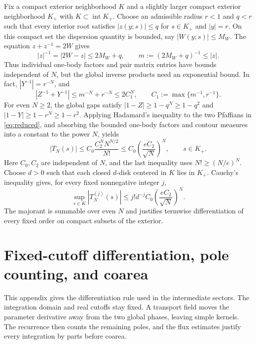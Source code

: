\documentclass[11pt]{article}
\numberwithin{equation}{section}
\theoremstyle{definition}
\begin{document}
Fix a compact exterior neighborhood \(K\) and a slightly larger
compact exterior neighborhood \(K_+\) with
\(K\subset\operatorname{int}K_+\). Choose an admissible radius
\(r<1\) and \(q<r\) such that every interior root satisfies
\(|z(y;s)|\le q\) for \(s\in K_+\) and \(|y|=r\).
On this compact set the dispersion quantity is bounded, say
\(|W(y;s)|\le M_W\). The equation \(z+z^{-1}=2W\) gives
\[
 |z|^{-1}=|2W-z|\le 2M_W+q,
 \qquad m:=(2M_W+q)^{-1}\le |z|.
\]
Thus individual one-body factors and pair matrix entries have bounds
independent of \(N\), but the global inverse products need an
exponential bound. In fact, \(|Y^{-1}|=r^{-N}\), and
\[
 |Z^{-1}+Y^{-1}|\le m^{-N}+r^{-N}\le 2C_1^N,
 \qquad C_1:=\max\{m^{-1},r^{-1}\}.
\]
For even \(N\ge2\), the global gaps satisfy
\(|1-Z|\ge1-q^N\ge1-q^2\) and
\(|1-Y|\ge1-r^N\ge1-r^2\).
Applying Hadamard's inequality to the two Pfaffians in
\eqref{eq:reduced}, and absorbing the bounded one-body factors and
contour measures into a constant to the power \(N\), yields
\[
 |T_N(s)|\le C_0\frac{C_2^N N^{N/2}}{N!}
       \le C_0\left(\frac{eC_2}{\sqrt N}\right)^N,
 \qquad s\in K_+.
\]
Here \(C_0,C_2\) are independent of \(N\), and the last inequality
uses \(N!\ge(N/e)^N\).
Choose \(d>0\) such that each closed \(d\)-disk centered in \(K\)
lies in \(K_+\). Cauchy's inequality gives, for every fixed
nonnegative integer \(j\),
\[
 \sup_{s\in K}|T_N^{(j)}(s)|
 \le j!d^{-j}C_0\left(\frac{eC_2}{\sqrt N}\right)^N.
\]
The majorant is summable over even \(N\) and justifies termwise
differentiation of every fixed order on compact subsets of the exterior.



\section{Fixed-cutoff differentiation, pole counting, and coarea}
\label{app:lie}

This appendix gives the differentiation rule used in the intermediate
sectors. The integration domain and real cutoffs stay fixed. A transport
field moves the parameter derivative away from the two global phases,
leaving simple kernels. The recurrence then counts the remaining poles,
and the flux estimates justify every integration by parts before coarea.
\end{document}
